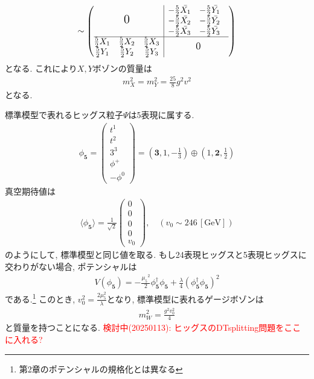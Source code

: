 \documentclass[uplatex,dvipdfmx,a4paper,titlepage]{jsbook}
\theoremstyle{plain}
\theoremstyle{definition}
\begin{document}
{\begin{align}
  [V_\mu, \Sigma] \sim \left(\begin{array}{@{}c|c@{}}
      {\Large{\mbox{$0$}}} &
      \begin{matrix}
        -\frac{5}{2}\bar{X_1} & -\frac{5}{2}\bar{Y_1} &   \\
        -\frac{5}{2}\bar{X_2} & -\frac{5}{2}\bar{Y_2} &   \\
        -\frac{5}{2}\bar{X_3} & -\frac{5}{2}\bar{Y_3} &   \\
      \end{matrix} \\
      \hline
      \begin{matrix}
        \frac{5}{2}X_1 & \frac{5}{2}X_2 & \frac{5}{2}X_3 \\
        \frac{5}{2}Y_1 & \frac{5}{2}Y_2 & \frac{5}{2}Y_3 \\
      \end{matrix} & {\large{\mbox{$0$}}}
  \end{array}\right)
\end{align}  
となる.
これにより$X, Y$ボゾンの質量は
\begin{align}
  m_X^2 = m_Y^2 = \frac{25}{8}g^2v^2
\end{align}
となる.

標準模型で表れるヒッグス粒子$\Psi$は5表現に属する.
\begin{align}
  \phi_{\bm{5}} = \left(
  \begin{array}{c}
      t^1 \\
      t^2 \\
      3^3 \\
      \phi^+ \\
      -\phi^0
  \end{array}\right) =\left(\bm{3}, 1,-\frac{1}{3}\right)\oplus\left(1,\bm{2},\frac{1}{2}\right)
\end{align}
真空期待値は
\begin{align}
  \langle\phi_{\bm{5}}\rangle = \frac{1}{\sqrt{2}}\left(
  \begin{array}{c}
      0 \\
      0 \\
      0 \\
      0 \\
      v_0
  \end{array}\right),\quad(v_0\sim 246\,[\mathrm{GeV}])
\end{align}
のようにして, 標準模型と同じ値を取る.
もし24表現ヒッグスと5表現ヒッグスに交わりがない場合, ポテンシャルは
\begin{align}
  V(\phi_{\bm{5}}) = -\frac{{\mu_5}^2}{2}\phi_{\bm{5}}^\dagger \phi_{\bm{5}} + \frac{\lambda}{4}(\phi_{\bm{5}}^\dagger \phi_{\bm{5}})^2
\end{align}
である.\footnote{第2章のポテンシャルの規格化とは異なる}
このとき, $v_0^2 =\frac{2\mu_5^2}{\lambda}$となり, 標準模型に表れるゲージボゾンは
\begin{align}
  m_W^2 = \frac{g^2 v_0^2}{4}
\end{align}
と質量を持つことになる.
\textcolor{red}{検討中(20250113): ヒッグスのDTsplitting問題をここに入れる?}
}
\end{document}
